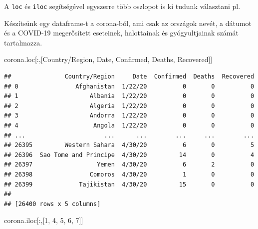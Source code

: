 \documentclass[
]{book}
\newenvironment{Shaded}{\begin{snugshade}}{\end{snugshade}}
\newcommand{\DecValTok}[1]{\textcolor[rgb]{0.00,0.00,0.81}{#1}}
\newcommand{\NormalTok}[1]{#1}
\newcommand{\StringTok}[1]{\textcolor[rgb]{0.31,0.60,0.02}{#1}}
\begin{document}
A \texttt{loc} és \texttt{iloc} segítségével egyszerre több oszlopot is ki tudunk választani pl.

Készítsünk egy dataframe-t a corona-ból, ami csak az országok nevét, a dátumot és a COVID-19 megerősített eseteinek, halottainak és gyógyultjainak számát tartalmazza.

\begin{Shaded}
\begin{Highlighting}[]
\NormalTok{corona.loc[:,[}\StringTok{\textquotesingle{}Country/Region\textquotesingle{}}\NormalTok{, }\StringTok{\textquotesingle{}Date\textquotesingle{}}\NormalTok{, }\StringTok{\textquotesingle{}Confirmed\textquotesingle{}}\NormalTok{, }\StringTok{\textquotesingle{}Deaths\textquotesingle{}}\NormalTok{, }\StringTok{\textquotesingle{}Recovered\textquotesingle{}}\NormalTok{]]}
\end{Highlighting}
\end{Shaded}

\begin{verbatim}
##               Country/Region     Date  Confirmed  Deaths  Recovered
## 0                Afghanistan  1/22/20          0       0          0
## 1                    Albania  1/22/20          0       0          0
## 2                    Algeria  1/22/20          0       0          0
## 3                    Andorra  1/22/20          0       0          0
## 4                     Angola  1/22/20          0       0          0
## ...                      ...      ...        ...     ...        ...
## 26395         Western Sahara  4/30/20          6       0          5
## 26396  Sao Tome and Principe  4/30/20         14       0          4
## 26397                  Yemen  4/30/20          6       2          0
## 26398                Comoros  4/30/20          1       0          0
## 26399             Tajikistan  4/30/20         15       0          0
## 
## [26400 rows x 5 columns]
\end{verbatim}

\begin{Shaded}
\begin{Highlighting}[]
\NormalTok{corona.iloc[:,[}\DecValTok{1}\NormalTok{, }\DecValTok{4}\NormalTok{, }\DecValTok{5}\NormalTok{, }\DecValTok{6}\NormalTok{, }\DecValTok{7}\NormalTok{]]}
\end{Highlighting}
\end{Shaded}
\end{document}
